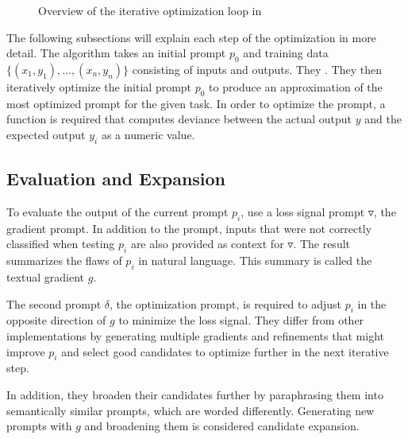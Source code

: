 \begin{figure}
\centering

\caption{Overview of the iterative optimization loop in \cite{pryzant2023AutomaticPrompt}}
\label{fig:gradient_descent}
\begin{comment}
TODO: 
\begin{itemize}
    \item add legend
    \item symbolise core loop
\end{itemize}
\end{comment}
\end{figure}

The following subsections will explain each step of the \ProTeGi optimization in more detail. The \ProTeGi algorithm takes an initial prompt $p_0$ and training data $\{(x_1, y_1), \dots, (x_n, y_n)\}$ consisting of inputs and outputs. They . They then iteratively optimize the initial prompt $p_0$ to produce an approximation of the most optimized prompt for the given task. In order to optimize the prompt, a function is required that computes deviance between the actual output $y$ and the expected output $y_i$ as a numeric value.


\subsection{Evaluation and Expansion}
To evaluate the output of the current prompt $p_i$, \citeauthor{pryzant2023AutomaticPrompt} use a loss signal prompt $\triangledown$, the gradient prompt. In addition to the prompt, inputs that were not correctly classified when testing $p_i$ are also provided as context for $\triangledown$. The result summarizes the flaws of $p_i$ in natural language. This summary is called the textual gradient $g$.

The second prompt $\delta$, the optimization prompt, is required to adjust $p_i$ in the opposite direction of $g$ to minimize the loss signal. They differ from other implementations by generating multiple gradients and refinements that might improve $p_i$ and select good candidates to optimize further in the next iterative step.

In addition, they broaden their candidates further by paraphrasing them into semantically similar prompts, which are worded differently. Generating new prompts with $g$ and broadening them is considered candidate expansion.


